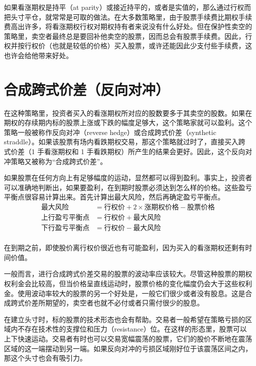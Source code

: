 如果看涨期权是持平（at parity）或接近持平的，或者是实值的，那么通过行权而把头寸平仓，就常常是可取的做法。在大多数策略里，由于股票手续费比期权手续费高出许多，将看涨期权行权对期权持有者来说没有什么好处。但在保护性卖空的策略里，卖空者最终总是要回补他卖空的股票，因而总会有股票手续费。因此，行权并按行权价（也就是较低的价格）买入股票，或许还能因此少支付些手续费，这也许会给他带来好处。
\section{合成跨式价差（反向对冲）}
在这种策略里，投资者买入的看涨期权所对应的股数要多于其卖空的股数。如果在期权的存续期内标的股票上涨或下跌的幅度足够大，这个策略家就可以盈利。这个策略一般被称作反向对冲（reverse hedge）或合成跨式价差（synthetic straddle）。如果该股票有场内看跌期权交易，那这个策略就过时了，直接买入跨式价差（1 手看涨期权和 1 手看跌期权）所产生的结果会更好。因此，这个反向对冲策略又被称为“合成跨式价差”。

如果股票在任何方向上有足够幅度的运动，显然都可以得到盈利。事实上，投资者可以准确地判断出，如果要盈利，在到期时股票必须达到怎么样的价格。这些盈亏平衡点很容易计算出来。首先计算出最大风险，然后再确定盈亏平衡点。
\begin{equation}
    \begin{aligned}
        \text{最大风险}    & =\text{行权价}+2\times \text{涨期权价格}-\text{股票价格} \\
        \text{上行盈亏平衡点} & =\text{行权价}+\text{最大风险}                      \\
        \text{下行盈亏平衡点} & =\text{行权价}-\text{最大风险}                      \\
    \end{aligned}
\end{equation}

在到期之前，即使股价离行权价很近也有可能盈利，因为买入的看涨期权还剩有时间价值。

一般而言，进行合成跨式价差交易的股票的波动率应该较大。尽管这种股票的期权权利金会比较高，但当价格呈直线运动时，股票价格的变化幅度仍会大于这些权利金。使用波动率较大的股票的另一个好处是，一般它们很少或者没有股息。这是合成跨式价差所期望的，卖空者也就不必付或者只需付很少的股息。

在建立头寸时，标的股票的技术形态也会有帮助。交易者一般希望在策略亏损的区域内不存在技术性的支撑位和压力（resistance）位。在这样的形态里，股票可以上下快速运动。交易者有时也可以交易宽幅震荡的股票，它们的股价不断地在震荡区域的这一端摆动到另一端。如果反向对冲的亏损区域刚好位于该震荡区间之内，那这个头寸也会有吸引力。
